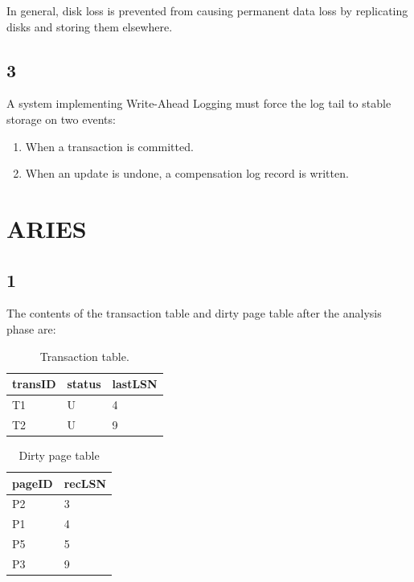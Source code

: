 In general, disk loss is prevented from causing permanent data loss by
replicating disks and storing them elsewhere.

\subsection*{3}
A system implementing Write-Ahead Logging must force the log tail to stable
storage on two events:
\begin{enumerate}
    \item When a transaction is committed.
    \item When an update is undone, a compensation log record is written.
\end{enumerate}

\section{ARIES}




\subsection*{1}
The contents of the transaction table and dirty page table after the analysis
phase are:
\begin{table}[h!]
    \begin{tabular}{|l|l|l|}
        \hline
        transID & status & lastLSN \\ \hline
        T1 & U & 4 \\ \hline
        T2 & U & 9 \\ \hline
    \end{tabular}
    \caption{Transaction table.}
\end{table}

\begin{table}[h!]
    \begin{tabular}{|l|l|}
        \hline
        pageID & recLSN \\ \hline
        P2 & 3 \\ \hline
        P1 & 4 \\ \hline
        P5 & 5 \\ \hline
        P3 & 9 \\ \hline
    \end{tabular}
    \caption{Dirty page table}
\end{table}

